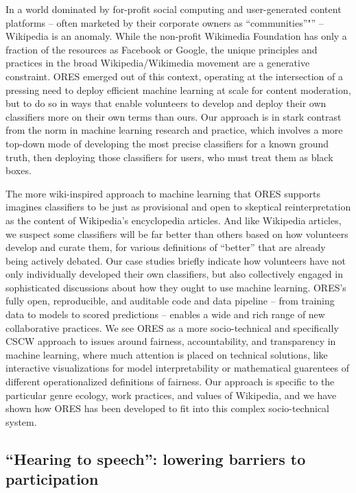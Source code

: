 In a world dominated by for-profit social computing and user-generated content platforms -- often marketed by their corporate owners as ``communities''"'' -- \cite{gillespie2018custodians} Wikipedia is an anomaly. While the non-profit Wikimedia Foundation has only a fraction of the resources as Facebook or Google, the unique principles and practices in the broad Wikipedia/Wikimedia movement are a generative constraint. ORES emerged out of this context, operating at the intersection of a pressing need to deploy efficient machine learning at scale for content moderation, but to do so in ways that enable volunteers to develop and deploy their own classifiers more on their own terms than ours. Our approach is in stark contrast from the norm in machine learning research and practice, which involves a more top-down mode of developing the most precise classifiers for a known ground truth, then deploying those classifiers for users, who must treat them as black boxes.

The more wiki-inspired approach to machine learning that ORES supports imagines classifiers to be just as provisional and open to skeptical reinterpretation as the content of Wikipedia's encyclopedia articles. And like Wikipedia articles, we suspect some classifiers will be far better than others based on how volunteers develop and curate them, for various definitions of ``better'' that are already being actively debated. Our case studies briefly indicate how volunteers have not only individually developed their own classifiers, but also collectively engaged in sophisticated discussions about how they ought to use machine learning. ORES's fully open, reproducible, and auditable code and data pipeline -- from training data to models to scored predictions -- enables a wide and rich range of new collaborative practices. We see ORES as a more socio-technical and specifically CSCW approach to issues around fairness, accountability, and transparency in machine learning, where much attention is placed on technical solutions, like interactive visualizations for model interpretability or mathematical guarentees of different operationalized definitions of fairness. Our approach is specific to the particular genre ecology, work practices, and values of Wikipedia, and we have shown how ORES has been developed to fit into this complex socio-technical system.

\subsection{``Hearing to speech'': lowering barriers to participation}

